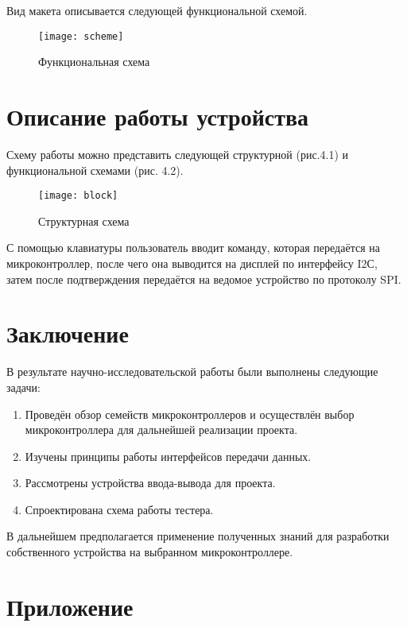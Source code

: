 \documentclass[14pt, oneside]{altsu-report}
\begin{document}
	Вид макета описывается следующей функциональной схемой.
	\begin{figure}[H]
	\begin{center}
	\texttt{[image: scheme]}
	\end{center}	
	\caption{Функциональная схема}
	\end{figure}	
	
		
\chapter{Описание работы устройства}
	Схему работы можно представить следующей структурной (рис.4.1) и функциональной схемами (рис. 4.2).
	\begin{figure}[H]
	\begin{center}
	\texttt{[image: block]}
	\end{center}	
	\caption{Структурная схема}
	\end{figure}	
		

	С помощью клавиатуры пользователь вводит команду, которая передаётся на микроконтроллер, после чего она выводится на дисплей по интерфейсу I2С, затем после подтверждения передаётся на ведомое устройство по протоколу SPI.

\chapter*{Заключение}
	В результате научно-исследовательской работы были выполнены следующие задачи:
	\begin{enumerate}
		\item Проведён обзор семейств микроконтроллеров и осуществлён выбор микроконтроллера для дальнейшей реализации проекта.
		\item Изучены принципы работы интерфейсов передачи данных.
		\item Рассмотрены устройства ввода-вывода для проекта.
		\item Спроектирована схема работы тестера.
	\end{enumerate}
	
	В дальнейшем предполагается применение полученных знаний для разработки собственного устройства на выбранном микроконтроллере.
\newpage
{}
\printbibliography[title={Список использованной литературы}] 

\newpage
\chapter*{\raggedleft\label{appendix1}Приложение}
\end{document}
